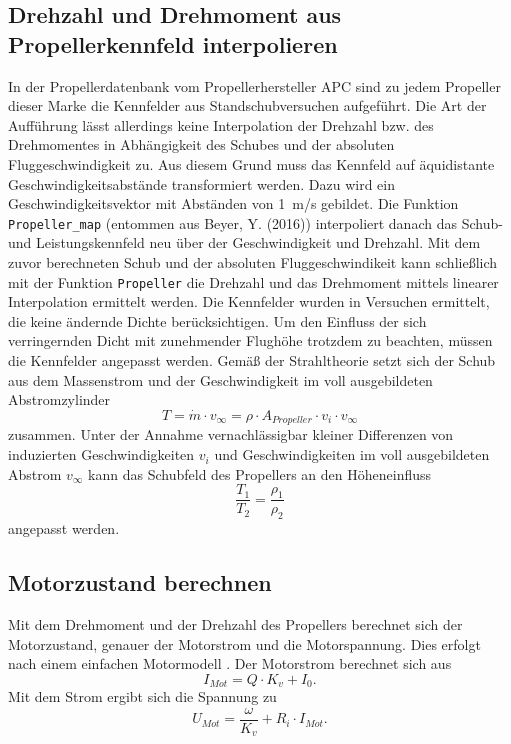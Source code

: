 \subsection{Drehzahl und Drehmoment aus Propellerkennfeld interpolieren}
In der Propellerdatenbank vom Propellerhersteller APC sind zu jedem Propeller dieser Marke die Kennfelder aus Standschubversuchen aufgeführt. Die Art der Aufführung lässt allerdings keine Interpolation der Drehzahl bzw. des Drehmomentes in Abhängigkeit des Schubes und der absoluten Fluggeschwindigkeit zu. Aus diesem Grund muss das Kennfeld auf äquidistante Geschwindigkeitsabstände transformiert werden. Dazu wird ein Geschwindigkeitsvektor mit Abständen von \SI{1}{m/s} gebildet. Die Funktion \texttt{Propeller\_map} (entommen aus Beyer, Y. (2016)) interpoliert danach das Schub- und Leistungskennfeld neu über der Geschwindigkeit und Drehzahl. Mit dem zuvor berechneten Schub und der absoluten Fluggeschwindikeit kann schließlich mit der Funktion \texttt{Propeller} die Drehzahl und das Drehmoment mittels linearer Interpolation ermittelt werden.
Die Kennfelder wurden in Versuchen ermittelt, die keine ändernde Dichte berücksichtigen. Um den Einfluss der sich verringernden Dicht mit zunehmender Flughöhe trotzdem zu beachten, müssen die Kennfelder angepasst werden. Gemäß der Strahltheorie setzt sich der Schub aus dem Massenstrom und der Geschwindigkeit im voll ausgebildeten Abstromzylinder 
\begin{equation}
	T =  \dot{m}\cdot v_{\infty} = \rho\cdot A_{Propeller}\cdot v_i\cdot v_{\infty}
\end{equation}
zusammen. Unter der Annahme vernachlässigbar kleiner Differenzen von  induzierten Geschwindigkeiten $v_i$ und Geschwindigkeiten im voll ausgebildeten Abstrom $v_{\infty}$ kann das Schubfeld des Propellers an den Höheneinfluss 
\begin{equation}
	\frac{T_1}{T_2} = \frac{\rho_1}{\rho_2}
\end{equation}
angepasst werden.


\subsection{Motorzustand berechnen}
Mit dem Drehmoment und der Drehzahl des Propellers berechnet sich der Motorzustand, genauer der Motorstrom und die Motorspannung. Dies erfolgt nach einem einfachen Motormodell \cite{Drela.2007}.
Der Motorstrom berechnet sich aus 
\begin{equation}
	I_{Mot} = Q\cdot K_v + I_0. \label{eq:motorstrom}
\end{equation}
Mit dem Strom ergibt sich die Spannung zu
\begin{equation}
	U_{Mot} = \frac{\omega}{K_v} + R_i\cdot I_{Mot}. \label{eq:motorspannung}
\end{equation}


